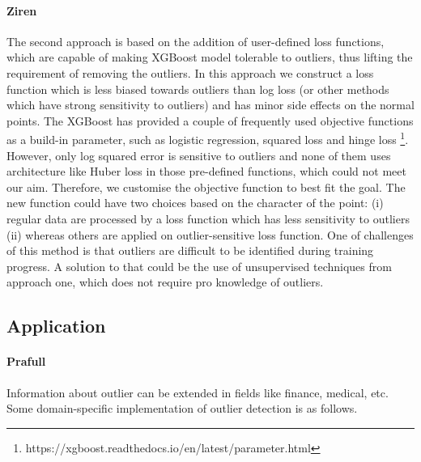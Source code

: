 \documentclass[runningheads]{llncs}
\begin{document}
\paragraph{Ziren} The second approach is based on the addition of user-defined loss functions, which are capable of making XGBoost model tolerable to outliers, thus lifting the requirement of removing the outliers. In this approach we construct a loss function which is less biased towards outliers than log loss (or other methods which have strong sensitivity to outliers) and has minor side effects on the normal points. The XGBoost has provided a couple of frequently used objective functions as a build-in parameter, such as logistic regression, squared loss and hinge loss \footnote{https://xgboost.readthedocs.io/en/latest/parameter.html}. However, only log squared error is sensitive to outliers and none of them uses architecture like Huber loss in those pre-defined functions, which could not meet our aim. Therefore, we customise the objective function to best fit the goal. The new function could have two choices based on the character of the point: (i) regular data are processed by a loss function which has less sensitivity to outliers (ii) whereas others are applied on outlier-sensitive loss function. One of challenges of this method is that outliers are difficult to be identified during training progress. A solution to that could be the use of unsupervised techniques from approach one, which does not require pro knowledge of outliers.




\subsection{Application}
\paragraph{Prafull} Information about outlier can be extended in fields like finance, medical, etc. Some domain-specific implementation of outlier detection is as follows.
\end{document}

